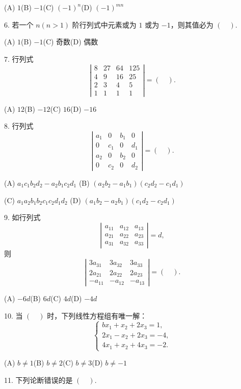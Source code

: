 \documentclass[UTF8, 12pt, fontset=fandol, oneside]{ctexart}
\begin{document}
(A) $1$\qquad (B) $-1$\qquad (C) $(-1)^n$\qquad (D) $(-1)^{mn}$

6. 若一个 $n(n>1)$ 阶行列式中元素或为 $1$ 或为 $-1$，则其值必为 $(\quad)$.

(A) $1$\qquad (B) $-1$\qquad (C) 奇数\qquad (D) 偶数

7. 行列式
\[
\left|\begin{array}{cccc}
8&27&64&125\\
4&9&16&25\\
2&3&4&5\\
1&1&1&1
\end{array}\right|=(\quad).
\]

(A) $12$\qquad (B) $-12$\qquad (C) $16$\qquad (D) $-16$

8. 行列式
\[
\left|\begin{array}{cccc}
a_1&0&b_1&0\\
0&c_1&0&d_1\\
a_2&0&b_2&0\\
0&c_2&0&d_2
\end{array}\right|=(\quad).
\]

(A) $a_1c_1b_2d_2-a_2b_1c_2d_1$\qquad
(B) $(a_2b_2-a_1b_1)(c_2d_2-c_1d_1)$

(C) $a_1a_2b_1b_2c_1c_2d_1d_2$\qquad
(D) $(a_1b_2-a_2b_1)(c_1d_2-c_2d_1)$

9. 如行列式
\[
\left|\begin{array}{ccc}
a_{11}&a_{12}&a_{13}\\
a_{21}&a_{22}&a_{23}\\
a_{31}&a_{32}&a_{33}
\end{array}\right|=d,
\]
则
\[
\left|\begin{array}{ccc}
3a_{31}&3a_{32}&3a_{33}\\
2a_{21}&2a_{22}&2a_{23}\\
-a_{11}&-a_{12}&-a_{13}
\end{array}\right|=(\quad).
\]

(A) $-6d$\qquad (B) $6d$\qquad (C) $4d$\qquad (D) $-4d$

10. 当 $(\quad)$ 时，下列线性方程组有唯一解：
\[
\left\{\begin{array}{l}
bx_1+x_2+2x_3=1,\\
2x_1-x_2+2x_3=-4,\\
4x_1+x_2+4x_3=-2.
\end{array}\right.
\]

(A) $b\ne1$\qquad (B) $b\ne2$\qquad (C) $b\ne3$\qquad (D) $b\ne-1$

11. 下列论断错误的是 $(\quad)$.
\end{document}
